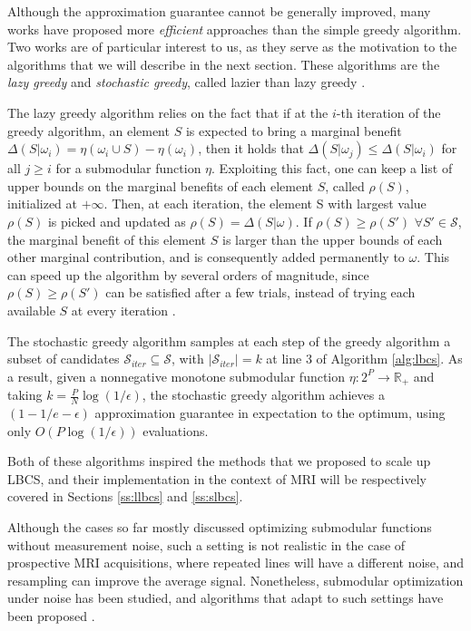 Although the approximation guarantee cannot be generally improved, many works have proposed more \textit{efficient} approaches than the simple greedy algorithm. Two works are of particular interest to us, as they serve as the motivation to the algorithms that we will describe in the next section. These algorithms are the \textit{lazy greedy} \citep{minoux1978accelerated} and \textit{stochastic greedy}, called lazier than lazy greedy \citep{mirzasoleiman2015lazier}. 

The lazy greedy algorithm relies on the fact that if at the $i$-th iteration of the greedy algorithm, an element $S$ is expected to bring a marginal benefit $ \Delta(S|\omega_{i}) = \eta(\omega_{i}\cup S) - \eta(\omega_{i})$, then it holds that $\Delta(S|\omega_{j}) \le \Delta(S|\omega_{i})$  for all $j \ge i$ for a submodular function $\eta$. Exploiting this fact, one can keep a list of upper bounds on the marginal benefits of each element $S$, called $\rho(S)$, initialized at $+\infty$.  Then, at each iteration, the element S with largest value $\rho(S)$ is picked and updated as $\rho(S) = \Delta(S|\omega)$.  If $\rho(S) \ge \rho(S')$ $\forall S' \in \mathcal S$, the marginal benefit of this element $S$ is larger than  the upper bounds of each other marginal contribution, and is consequently added permanently to $\omega$. This can speed up the algorithm by several orders of magnitude, since $\rho(S) \ge \rho(S')$ can be satisfied after a few trials, instead of trying each available $S$ at every iteration \citep{krause2014submodular}. 

The stochastic greedy algorithm \citep{mirzasoleiman2015lazier} samples at each step of the greedy algorithm a subset of candidates $\mathcal{S}_{iter} \subseteq \mathcal{S}$, with $|\mathcal{S}_{iter}|=k$ at line 3 of Algorithm \ref{alg:lbcs}. As a result, given a nonnegative monotone submodular function $\eta:2^P \to \mathbb{R}_+$ and taking $k=\frac{P}{N} \log\left(1/\epsilon\right)$,  the stochastic greedy algorithm achieves a $(1-1/e-\epsilon)$ approximation guarantee in expectation to the optimum, using only $O\left(P\log(1/\epsilon)\right)$ evaluations. 

Both of these algorithms inspired the methods that we proposed to scale up LBCS, and their implementation in the context of MRI will be respectively covered in Sections \ref{ss:llbcs} and \ref{ss:slbcs}.

\begin{remark}
    Although the cases so far mostly discussed optimizing submodular functions without measurement noise, such a setting is not realistic in the case of prospective MRI acquisitions, where repeated lines will have a different noise, and resampling can improve the average signal. Nonetheless, submodular optimization under noise has been studied, and algorithms that adapt to such settings have been proposed \citep{singla2016noisy,hassidim2017submodular}.
\end{remark}

